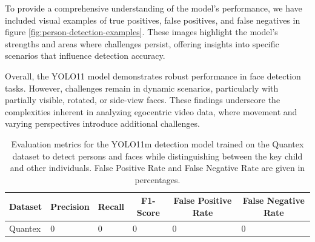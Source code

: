 \documentclass[
  man,floatsintext]{apa6}
\begin{document}
To provide a comprehensive understanding of the model's performance, we have included visual examples of true positives, false positives, and false negatives in figure \ref{fig:person-detection-examples}. These images highlight the model's strengths and areas where challenges persist, offering insights into specific scenarios that influence detection accuracy.

Overall, the YOLO11 model demonstrates robust performance in face detection tasks. However, challenges remain in dynamic scenarios, particularly with partially visible, rotated, or side-view faces. These findings underscore the complexities inherent in analyzing egocentric video data, where movement and varying perspectives introduce additional challenges.

\begin{table}[tbp]

\begin{center}
\begin{threeparttable}

\caption{\label{tab:person-detection-metrics-detailed}Evaluation metrics for the YOLO11m detection model trained on the Quantex dataset to detect persons and faces while distinguishing between the key child and other individuals. False Positive Rate and False Negative Rate are given in percentages.}

\begin{tabular}{llllll}
\toprule
Dataset & \multicolumn{1}{c}{Precision} & \multicolumn{1}{c}{Recall} & \multicolumn{1}{c}{F1-Score} & \multicolumn{1}{c}{False Positive Rate} & \multicolumn{1}{c}{False Negative Rate}\\
\midrule
Quantex & 0 & 0 & 0 & 0 & 0\\
\bottomrule
\end{tabular}

\end{threeparttable}
\end{center}

\end{table}
\end{document}
